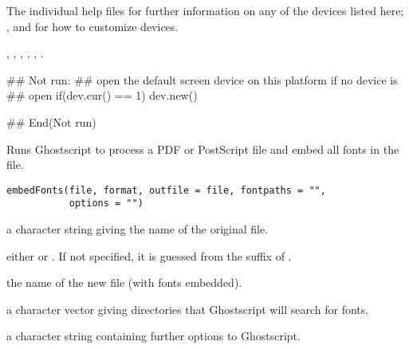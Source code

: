 %
\begin{SeeAlso}\relax
The individual help files for further information on any of the
devices listed here;
,
 and  for how to
customize devices.

,
, ,
, ,
.
\end{SeeAlso}
%
\begin{Examples}
\begin{ExampleCode}
## Not run: 
## open the default screen device on this platform if no device is
## open
if(dev.cur() == 1) dev.new()

## End(Not run)
\end{ExampleCode}
\end{Examples}
%
\begin{Description}\relax
Runs Ghostscript to process a PDF or PostScript file and
embed all fonts in the file.
\end{Description}
%
\begin{Usage}
\begin{verbatim}
embedFonts(file, format, outfile = file, fontpaths = "",
           options = "")
\end{verbatim}
\end{Usage}
%
\begin{Arguments}
\begin{ldescription}
\item[\code{file}] a character string giving the name of the original file.
\item[\code{format}] either  or .
If not specified, it is guessed from the suffix of .
\item[\code{outfile}] the name of the new file (with fonts embedded).
\item[\code{fontpaths}] a character vector giving directories that
Ghostscript will search for fonts.
\item[\code{options}] a character string containing further options to
Ghostscript.
\end{ldescription}
\end{Arguments}
%
